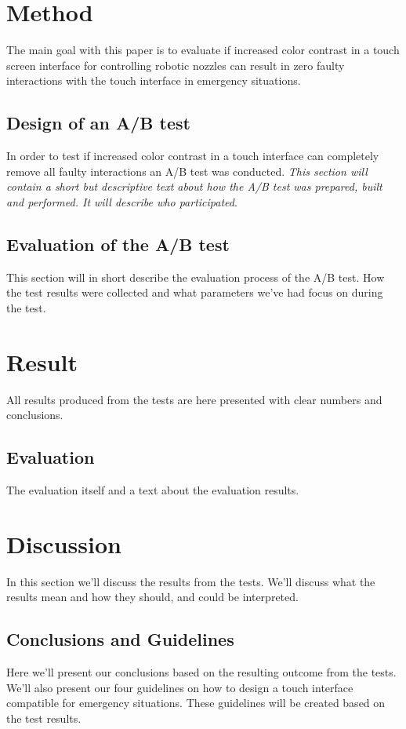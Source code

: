 \documentclass[runningheads,a4paper,oribibl]{llncs}
\begin{document}
\section{Method}
The main goal with this paper is to evaluate if increased color contrast in a touch screen interface for controlling robotic nozzles can result in zero faulty interactions with the touch interface in emergency situations.

\subsection{Design of an A/B test}
In order to test if increased color contrast in a touch interface can completely remove all faulty interactions an A/B test was conducted.
\emph{This section will contain a short but descriptive text about how the A/B test was prepared, built and performed. It will describe who participated}.

\subsection{Evaluation of the A/B test}
This section will in short describe the evaluation process of the A/B test. How the test results were collected and what parameters we've had focus on during the test.

\section{Result}
All results produced from the tests are here presented with clear numbers and conclusions.

\subsection{Evaluation}
The evaluation itself and a text about the evaluation results.

\section{Discussion}
In this section we'll discuss the results from the tests. We'll discuss what the results mean and how they should, and could be interpreted.

\subsection{Conclusions and Guidelines}
Here we'll present our conclusions based on the resulting outcome from the tests. We'll also present our four guidelines on how to design a touch interface compatible for emergency situations. These guidelines will be created based on the test results.
\end{document}
